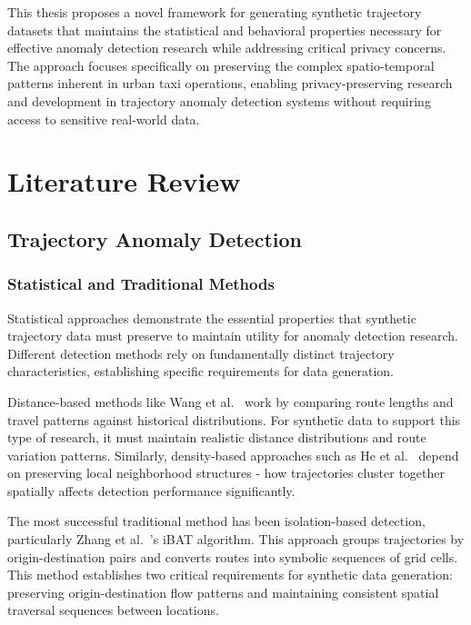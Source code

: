 \documentclass[runningheads]{llncs}
\begin{document}
This thesis proposes a novel framework for generating synthetic trajectory datasets that maintains the statistical and behavioral properties necessary for effective anomaly detection research while addressing critical privacy concerns. The approach focuses specifically on preserving the complex spatio-temporal patterns inherent in urban taxi operations, enabling privacy-preserving research and development in trajectory anomaly detection systems without requiring access to sensitive real-world data.

\section{Literature Review}
\label{sec:literature-review}

\subsection{Trajectory Anomaly Detection}
\label{sec:anomaly-review}

\subsubsection{Statistical and Traditional Methods}
\label{sec:statistical-traditional}

Statistical approaches demonstrate the essential properties that synthetic trajectory data must preserve to maintain utility for anomaly detection research. Different detection methods rely on fundamentally distinct trajectory characteristics, establishing specific requirements for data generation.

Distance-based methods like Wang et al.~\cite{wangStatisticalFrameworkTaxi2020} work by comparing route lengths and travel patterns against historical distributions. For synthetic data to support this type of research, it must maintain realistic distance distributions and route variation patterns. Similarly, density-based approaches such as He et al.~\cite{heEnhancedDBSCANMultiple2020} depend on preserving local neighborhood structures - how trajectories cluster together spatially affects detection performance significantly.

The most successful traditional method has been isolation-based detection, particularly Zhang et al.~\cite{zhangIBATDetectingAnomalous2011}'s iBAT algorithm. This approach groups trajectories by origin-destination pairs and converts routes into symbolic sequences of grid cells. This method establishes two critical requirements for synthetic data generation: preserving origin-destination flow patterns and maintaining consistent spatial traversal sequences between locations.
\end{document}
